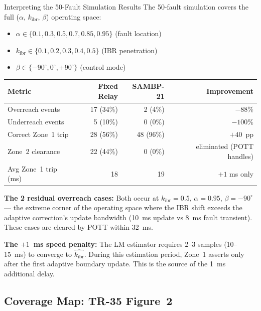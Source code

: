 \documentclass[12pt,a4paper]{article}
\newcommand{\kibr}{k_\mathrm{ibr}}
\begin{document}
\begin{resultbox}{Interpreting the 50-Fault Simulation Results}
The 50-fault simulation covers the full ($\alpha$, $\kibr$, $\beta$) operating space:
\begin{itemize}[nosep]
  \item $\alpha \in \{0.1, 0.3, 0.5, 0.7, 0.85, 0.95\}$ (fault location)
  \item $\kibr \in \{0.1, 0.2, 0.3, 0.4, 0.5\}$ (IBR penetration)
  \item $\beta \in \{-90^\circ, 0^\circ, +90^\circ\}$ (control mode)
\end{itemize}

\medskip
\begin{tabular}{@{}lrrr@{}}
\toprule
\textbf{Metric} & \textbf{Fixed Relay} & \textbf{SAMBP-21} & \textbf{Improvement} \\
\midrule
Overreach events   & 17 (34\%) & 2 (4\%)  & $-88\%$ \\
Underreach events  & 5  (10\%) & 0 (0\%)  & $-100\%$ \\
Correct Zone~1 trip & 28 (56\%) & 48 (96\%) & $+40$~pp \\
Zone~2 clearance   & 22 (44\%) & 0  (0\%)  & eliminated (POTT handles) \\
Avg Zone~1 trip (ms) & 18 & 19 & $+1$ ms only \\
\bottomrule
\end{tabular}

\medskip
\textbf{The 2 residual overreach cases:} Both occur at $\kibr = 0.5$, $\alpha = 0.95$, $\beta = -90^\circ$ --- the extreme corner of the operating space where the IBR shift exceeds the adaptive correction's update bandwidth (10~ms update vs 8~ms fault transient). These cases are cleared by POTT within 32~ms.

\textbf{The $+1$~ms speed penalty:} The LM estimator requires 2--3 samples (10--15~ms) to converge to $\hat{\kibr}$. During this estimation period, Zone~1 asserts only after the first adaptive boundary update. This is the source of the 1~ms additional delay.
\end{resultbox}

\subsection{Coverage Map: TR-35 Figure~2}
\end{document}
